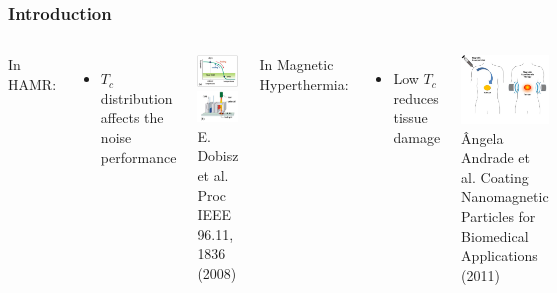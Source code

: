 \documentclass{beamer}
\begin{document}
\begin{frame}
	\frametitle{Introduction}
	\begin{columns}
		\column{6cm}
		In HAMR\footnotemark[1]:
		\begin{itemize}
			\item{$T_c$ distribution affects the noise performance}
		\end{itemize} \vspace{5mm}

		\begin{center}
		\includegraphics[width=2.9cm]{Images/coerc} \hspace{1mm}
		\includegraphics[width=2.9cm]{Images/laser} \\
		\tiny E. Dobisz et al. Proc IEEE 96.11, 1836 (2008)
		\end{center}

		\column{6cm}
		In Magnetic Hyperthermia\footnotemark[2]:
		\begin{itemize}
		\item{Low $T_c$ reduces tissue damage}
		\end{itemize}

		\begin{center}
		\includegraphics[width=4cm]{Images/person} \\
		\tiny \^{A}ngela Andrade et al. Coating Nanomagnetic Particles for Biomedical Applications (2011)
		\end{center}
	\end{columns}
\end{frame}
\end{document}
